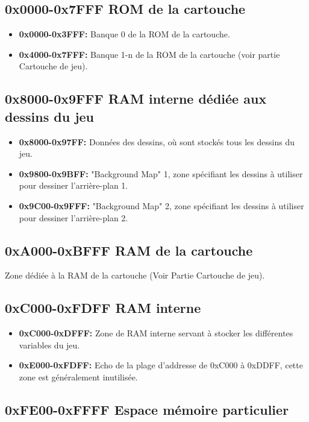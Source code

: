 \documentclass[french]{report}
\begin{document}
\subsection{0x0000-0x7FFF ROM de la cartouche}
\begin{itemize}
\item \textbf{0x0000-0x3FFF:} Banque 0 de la ROM de la cartouche.
\item \textbf{0x4000-0x7FFF:} Banque 1-n de la ROM de la cartouche (voir partie Cartouche de jeu).
\end{itemize}

\subsection{0x8000-0x9FFF RAM interne dédiée aux dessins du jeu}
\begin{itemize}
\item \textbf{0x8000-0x97FF:} Données des dessins, où sont stockés tous les dessins du jeu.
\item \textbf{0x9800-0x9BFF:} "Background Map" 1, zone spécifiant les dessins à utiliser pour dessiner l'arrière-plan 1.
\item \textbf{0x9C00-0x9FFF:} "Background Map" 2, zone spécifiant les dessins à utiliser pour dessiner l'arrière-plan 2. 
\end{itemize} 

\subsection{0xA000-0xBFFF RAM de la cartouche}
Zone dédiée à la RAM de la cartouche (Voir Partie Cartouche de jeu).

\subsection{0xC000-0xFDFF RAM interne}
\begin{itemize}
\item \textbf{0xC000-0xDFFF:} Zone de RAM interne servant à stocker les différentes variables du jeu.
\item \textbf{0xE000-0xFDFF:} Echo de la plage d'addresse de 0xC000 à 0xDDFF, cette zone est
généralement inutilisée.
\end{itemize} 

\subsection{0xFE00-0xFFFF Espace mémoire particulier}
\end{document}
